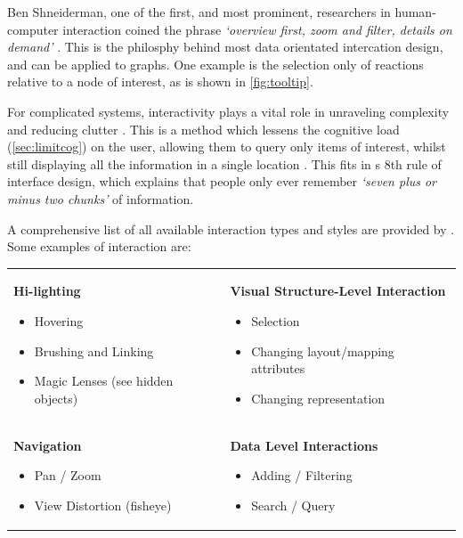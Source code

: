 Ben Shneiderman, one of the first, and most prominent, researchers in human-computer interaction coined the phrase \emph{`overview first, zoom and filter, details on demand'}  \citep{mantra}. This is the philosphy behind most data orientated intercation design, and can be applied to graphs. One example is the selection only of reactions relative to a node of interest, as is shown in \autoref{fig:tooltip}.

For complicated systems, interactivity plays a vital role in unraveling complexity and reducing clutter \citep{interaction1}. This is a method which lessens the cognitive load (\autoref{sec:limitcog}) on the user, allowing them to query only items of interest, whilst still displaying all the information in a single location \citep{oneplace}. This fits in \cite{rule8}s 8th rule of interface design, which explains that people only ever remember \emph{`seven plus or minus two chunks'} of information. 

A comprehensive list of all available interaction types and styles are provided by \cite{ch6}. Some examples of interaction are:\\ 

\begin{table}[h]
    \centering
    \begin{tabular}{p{}p{}}
\textbf{Hi-lighting}
\begin{itemize}
\item Hovering
\item Brushing and Linking
\item Magic Lenses (see hidden objects)
\end{itemize}
&
\textbf{Visual Structure-Level Interaction}
\begin{itemize}
\item Selection
\item Changing layout/mapping attributes
\item Changing representation
\end{itemize}
\\
\textbf{Navigation}
\begin{itemize}
\item Pan / Zoom
\item View Distortion (fisheye)
\end{itemize}
&
\textbf{Data Level Interactions}
\begin{itemize}
\item Adding / Filtering
\item Search / Query
\end{itemize}

\end{tabular}
    \label{tab:interactive}
\end{table}

